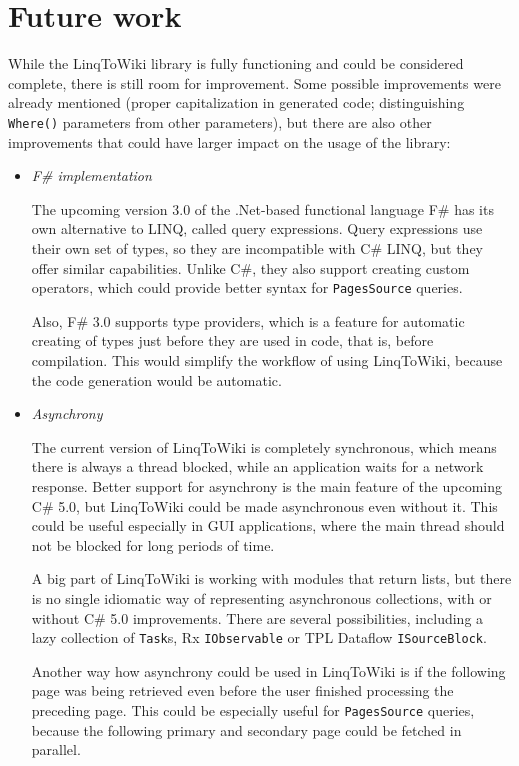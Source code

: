 \chapter{Future work}

While the LinqToWiki library is fully functioning and could be considered complete,
there is still room for improvement.
Some possible improvements were already mentioned
(proper capitalization in generated code;
distinguishing \lstinline{Where()} parameters from other parameters),
but there are also other improvements that could have larger impact on the usage of the library:

\begin{itemize}
\item \emph{F\# implementation}

The upcoming version 3.0 of the .Net-based functional language F\# has its own alternative to LINQ,
called query expressions.
Query expressions use their own set of types, so they are incompatible with C\# LINQ,
but they offer similar capabilities.
Unlike C\#, they also support creating custom operators,
which could provide better syntax for \lstinline{PagesSource} queries.

Also, F\# 3.0 supports type providers, which is a feature for automatic creating of types
just before they are used in code, that is, before compilation.
This would simplify the workflow of using LinqToWiki, because the code generation would be automatic.

\item \emph{Asynchrony}

The current version of LinqToWiki is completely synchronous,
which means there is always a thread blocked, while an application waits for a network response.
Better support for asynchrony is the main feature of the upcoming C\# 5.0,
but LinqToWiki could be made asynchronous even without it.
This could be useful especially in GUI applications, where the main thread should not be blocked for long periods of time.

A big part of LinqToWiki is working with modules that return lists,
but there is no single idiomatic way of representing asynchronous collections,
with or without C\# 5.0 improvements.
There are several possibilities, including a lazy collection of \lstinline{Task}s,
Rx \lstinline{IObservable} or TPL Dataflow \lstinline{ISourceBlock}.

Another way how asynchrony could be used in LinqToWiki is if the following page was being retrieved
even before the user finished processing the preceding page.
This could be especially useful for \lstinline{PagesSource} queries,
because the following primary and secondary page could be fetched in parallel.


\end{itemize}
